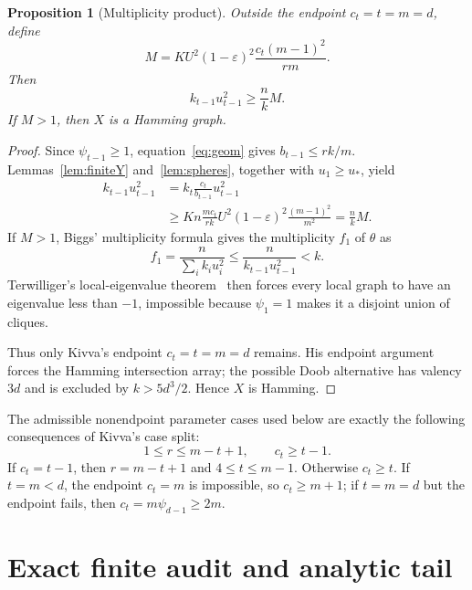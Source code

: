 \documentclass[11pt]{amsart}
\newtheorem{proposition}[theorem]{Proposition}
\theoremstyle{definition}
\newcommand{\eps}{\varepsilon}
\begin{document}
\begin{proposition}[Multiplicity product]\label{prop:M}
Outside the endpoint $c_t=t=m=d$, define
\begin{equation}\label{eq:Mdef}
 M=KU^2(1-\eps)^2\frac{c_t(m-1)^2}{rm}.
\end{equation}
Then
\begin{equation}\label{eq:productM}
 k_{t-1}u_{t-1}^2\ge\frac{n}{k}M.
\end{equation}
If $M>1$, then $X$ is a Hamming graph.
\end{proposition}

\begin{proof}
Since $\psi_{t-1}\ge1$, equation~\eqref{eq:geom} gives $b_{t-1}\le rk/m$.  Lemmas~\ref{lem:finiteY} and~\ref{lem:spheres}, together with $u_1\ge u_*$, yield
\begin{align*}
 k_{t-1}u_{t-1}^2
 &=k_t\frac{c_t}{b_{t-1}}u_{t-1}^2\\
 &\ge Kn\frac{mc_t}{rk}U^2
 (1-\eps)^2\frac{(m-1)^2}{m^2}
 =\frac{n}{k}M.
\end{align*}
If $M>1$, Biggs' multiplicity formula gives the multiplicity $f_1$ of $\theta$ as
\[
 f_1=\frac{n}{\sum_i k_i u_i^2}
 \le\frac{n}{k_{t-1}u_{t-1}^2}<k.
\]
Terwilliger's local-eigenvalue theorem~\cite[Theorem 4.1]{Kivva} then forces every local graph to have an eigenvalue less than $-1$, impossible because $\psi_1=1$ makes it a disjoint union of cliques.

Thus only Kivva's endpoint $c_t=t=m=d$ remains.  His endpoint argument forces the Hamming intersection array; the possible Doob alternative has valency $3d$ and is excluded by $k>5d^3/2$.  Hence $X$ is Hamming.
\end{proof}

The admissible nonendpoint parameter cases used below are exactly the following consequences of Kivva's case split:
\begin{equation}\label{eq:admissible}
 1\le r\le m-t+1,\qquad c_t\ge t-1.
\end{equation}
If $c_t=t-1$, then $r=m-t+1$ and $4\le t\le m-1$.  Otherwise $c_t\ge t$.  If $t=m<d$, the endpoint $c_t=m$ is impossible, so $c_t\ge m+1$; if $t=m=d$ but the endpoint fails, then $c_t=m\psi_{d-1}\ge2m$.

\section{Exact finite audit and analytic tail}\label{sec:audit}
\end{document}
